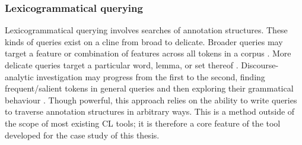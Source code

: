 

\subsubsection{Lexicogrammatical querying}

Lexicogrammatical querying involves searches of annotation structures. These kinds of queries exist on a cline from broad to delicate. Broader queries may target a feature or combination of features across all tokens in a \gls{corpus} \cite[\emph{e.g. What are the most\slash least common nominal group structures?}---see][]{teich_linguistic_2015}. More delicate queries target a particular word, lemma, or set thereof \cite[\emph{What are the most\slash least common nominal group structures when the head is `risk'}---see][]{zinn_changing_2015}. Discourse\hyp{}analytic investigation may progress from the first to the second, finding frequent\slash salient tokens in general queries and then exploring their grammatical behaviour \cite{baker_corpora_2013}. Though powerful, this approach relies on the ability to write queries to traverse annotation structures in arbitrary ways. This is a method outside of the scope of most existing \gls{CL} tools; it is therefore a core feature of the tool developed for the case study of this thesis.

